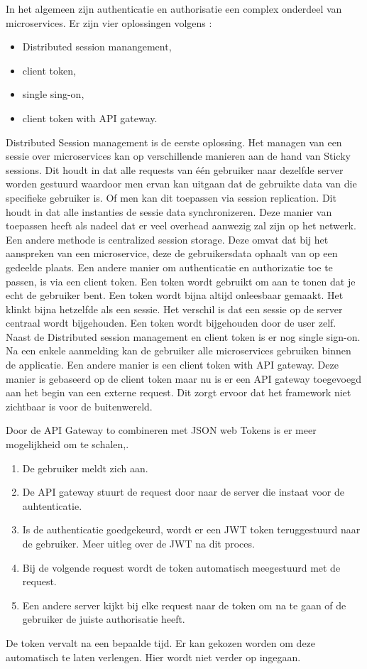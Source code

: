 In het algemeen zijn authenticatie en authorisatie een complex onderdeel van microservices.
Er zijn vier oplossingen volgens \textcite{Ayoub2018}:
\begin{itemize}
	\item Distributed session manangement,
	\item client token,
	\item single sing-on, 
	\item client token with API gateway.
\end{itemize}
Distributed Session management is de eerste oplossing. Het managen van een sessie over microservices kan op verschillende manieren aan de hand van Sticky sessions. Dit houdt in dat alle requests van één gebruiker naar dezelfde server worden gestuurd waardoor men ervan kan uitgaan dat de gebruikte data van die specifieke gebruiker is. Of men kan dit toepassen via session replication. Dit houdt in dat alle instanties de sessie data synchronizeren. Deze manier van toepassen heeft als nadeel dat er veel overhead aanwezig zal zijn op het netwerk. Een andere methode is centralized session storage. Deze omvat dat bij het aanspreken van een microservice, deze de gebruikersdata ophaalt van op een gedeelde plaats. 
Een andere manier om authenticatie en authorizatie toe te passen, is via een client token. Een token wordt gebruikt om aan te tonen dat je echt de gebruiker bent. Een token wordt bijna altijd onleesbaar gemaakt. Het klinkt bijna hetzelfde als een sessie. Het verschil is dat een sessie op de server centraal wordt bijgehouden. Een token wordt bijgehouden door de user zelf.
Naast de Distributed session management en client token is er nog single sign-on. Na een enkele aanmelding kan de gebruiker alle microservices gebruiken binnen de applicatie. 
Een andere manier is een client token with API gateway. Deze manier is gebaseerd op de client token maar nu is er een API gateway toegevoegd aan het begin van een externe request. Dit zorgt ervoor dat het framework niet zichtbaar is voor de buitenwereld. 

Door de API Gateway to combineren met JSON  web Tokens is er meer mogelijkheid om te schalen,\textcite{Siraj2017}. 
\begin{enumerate}
	\item De gebruiker meldt zich aan.
	\item De API gateway stuurt de request door naar de server die instaat voor de auhtenticatie.
	\item Is de authenticatie goedgekeurd, wordt er een JWT token teruggestuurd naar de gebruiker. Meer uitleg over de JWT na dit proces.
	\item Bij de volgende request wordt de token automatisch meegestuurd met de request.
	\item Een andere server kijkt bij elke request naar de token om na te gaan of de gebruiker de juiste authorisatie heeft. 
\end{enumerate}
De token vervalt na een bepaalde tijd. Er kan gekozen worden om deze automatisch te laten verlengen. Hier wordt niet verder op ingegaan. 

